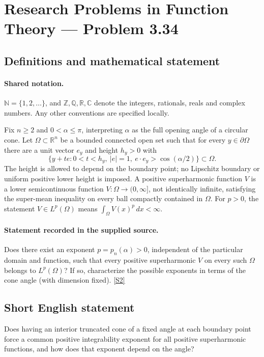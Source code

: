 \documentclass[11pt]{book}
\newcommand{\sref}[2]{\hyperlink{source:#1:#2}{[S#2]}}
\begin{document}
\section{Research Problems in Function Theory — Problem 3.34}\label{statement}

\subsection{Definitions and mathematical statement}

\paragraph{Shared notation.}$\mathbb N=\{1,2,\ldots\}$, and $\mathbb Z,\mathbb Q,\mathbb R,\mathbb C$ denote the integers, rationals, reals and complex numbers. Any other conventions are specified locally.


Fix $n\ge2$ and $0<\alpha\le\pi$, interpreting $\alpha$ as the full opening angle of a circular cone. Let $\Omega\subset\mathbb R^n$ be a bounded connected open set such that for every $y\in\partial\Omega$ there are a unit vector $e_y$ and height $h_y>0$ with
\[\{y+te:0<t<h_y,\ |e|=1,\ e\cdot e_y>\cos(\alpha/2)\}\subset\Omega.
\]
The height is allowed to depend on the boundary point; no Lipschitz boundary or uniform positive lower height is imposed. A positive superharmonic function $V$ is a lower semicontinuous function $V:\Omega\to(0,\infty]$, not identically infinite, satisfying the super-mean inequality on every ball compactly contained in $\Omega$. For $p>0$, the statement $V\in L^p(\Omega)$ means $\int_\Omega V(x)^p\,dx<\infty$.
\paragraph{Statement recorded in the supplied source.}
Does there exist an exponent $p=p_n(\alpha)>0$, independent of the particular domain and function, such that every positive superharmonic $V$ on every such $\Omega$ belongs to $L^p(\Omega)$? If so, characterize the possible exponents in terms of the cone angle (with dimension fixed). \sref{statement}{2}
\subsection{Short English statement}
Does having an interior truncated cone of a fixed angle at each boundary point force a common positive integrability exponent for all positive superharmonic functions, and how does that exponent depend on the angle?
\end{document}
